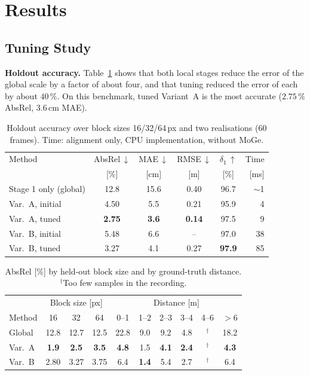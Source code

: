 \documentclass[conference]{IEEEtran}
\begin{document}
\section{Results}
\label{sec:results}

\subsection{Tuning Study}

\textbf{Holdout accuracy.} Table~\ref{tab:main} shows that both local stages
reduce the error of the global scale by a factor of about four, and that
tuning reduced the error of each by about \(40\,\%\). On this benchmark,
tuned Variant~A is the most accurate (\(2.75\,\%\) AbsRel, \(3.6\,\)cm MAE).

\begin{table}[t]
\centering
\caption{Holdout accuracy over block sizes 16/32/64\,px and two realisations
(60 frames). Time: alignment only, CPU implementation, without MoGe.}
\label{tab:main}
\footnotesize
\setlength{\tabcolsep}{4pt}
\begin{tabular}{@{}lccccr@{}}
\toprule
Method & AbsRel\,\(\downarrow\) & MAE\,\(\downarrow\) & RMSE\,\(\downarrow\) & \(\delta_1\)\,\(\uparrow\) & Time \\
 & [\%] & [cm] & [m] & [\%] & [ms] \\
\midrule
Stage 1 only (global)   & 12.8 & 15.6 & 0.40 & 96.7 & \(\sim\)1 \\
Var.~A, initial         & 4.50 & 5.5  & 0.21 & 95.9 & 4 \\
Var.~A, tuned           & \textbf{2.75} & \textbf{3.6} & \textbf{0.14} & 97.5 & 9 \\
Var.~B, initial         & 5.48 & 6.6  & --   & 97.0 & 38 \\
Var.~B, tuned           & 3.27 & 4.1  & 0.27 & \textbf{97.9} & 85 \\
\bottomrule
\end{tabular}
\end{table}

\begin{table}[t]
\centering
\caption{AbsRel [\%] by held-out block size and by ground-truth distance.
\(^\dagger\)Too few samples in the recording.}
\label{tab:breakdown}
\footnotesize
\setlength{\tabcolsep}{3.2pt}
\begin{tabular}{@{}lccc|cccccc@{}}
\toprule
& \multicolumn{3}{c|}{Block size [px]} & \multicolumn{6}{c}{Distance [m]}\\
Method & 16 & 32 & 64 & 0--1 & 1--2 & 2--3 & 3--4 & 4--6 & \(>\)6 \\
\midrule
Global  & 12.8 & 12.7 & 12.5 & 22.8 & 9.0 & 9.2 & 4.8 & \(^\dagger\) & 18.2 \\
Var.~A  & \textbf{1.9}  & \textbf{2.5}  & \textbf{3.5}  & \textbf{4.8}  & 1.5 & \textbf{4.1} & \textbf{2.4} & \(^\dagger\) & \textbf{4.3} \\
Var.~B  & 2.80 & 3.27 & 3.75 & 6.4  & \textbf{1.4} & 5.4 & 2.7 & \(^\dagger\) & 6.4 \\
\bottomrule
\end{tabular}
\end{table}
\end{document}
